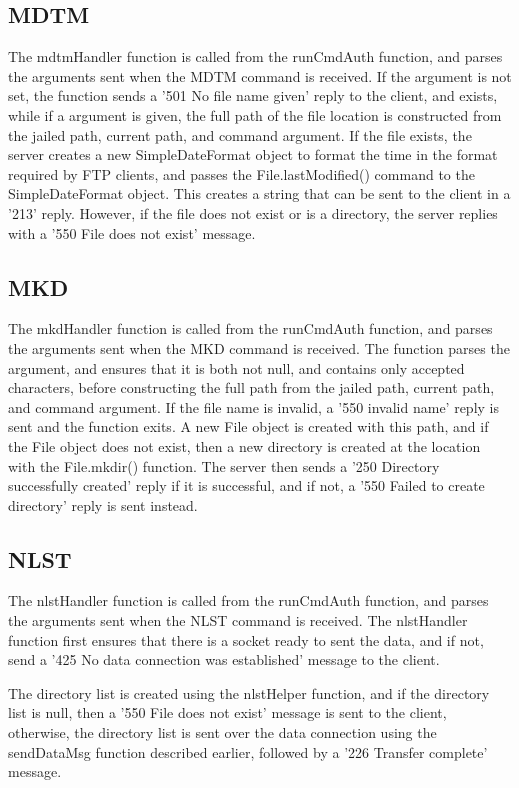 \documentclass[11pt,a4paper,titlepage]{article}
\begin{document}
\subsection{MDTM}
The mdtmHandler function is called from the runCmdAuth function, and parses the arguments sent when the MDTM command is received. If the argument is not set, the function sends a '501 No file name given' reply to the client, and exists, while if a argument is given, the full path of the file location is constructed from the jailed path, current path, and command argument. If the file exists, the server creates a new SimpleDateFormat object to format the time in the format required by FTP clients, and passes the File.lastModified() command to the SimpleDateFormat object. This creates a string that can be sent to the client in a '213' reply. However, if the file does not exist or is a directory, the server replies with a '550 File does not exist' message.

\subsection{MKD}
The mkdHandler function is called from the runCmdAuth function, and parses the arguments sent when the MKD command is received. The function parses the argument, and ensures that it is both not null, and contains only accepted characters, before constructing the full path from the jailed path, current path, and command argument. If the file name is invalid, a '550 invalid name' reply is sent and the function exits. A new File object is created with this path, and if the File object does not exist, then a new directory is created at the location with the File.mkdir() function. The server then sends a '250 Directory successfully created' reply if it is successful, and if not, a '550 Failed to create directory' reply is sent instead.

\subsection{NLST}
The nlstHandler function is called from the runCmdAuth function, and parses the arguments sent when the NLST command is received. The nlstHandler function first ensures that there is a socket ready to sent the data, and if not, send a '425 No data connection was established' message to the client.

The directory list is created using the nlstHelper function, and if the directory list is null, then a '550 File does not exist' message is sent to the client, otherwise, the directory list is sent over the data connection using the sendDataMsg function described earlier, followed by a '226 Transfer complete' message.
\end{document}
